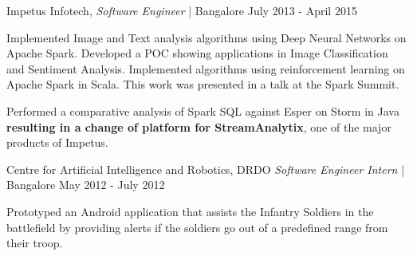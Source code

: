 \begin{cventries2}
  \cventrynew
    { Impetus Infotech, \textnormal{\textit{Software Engineer} | Bangalore}} %
    {July 2013 - April 2015} %
    {
      \begin{cvitems} %
        \item {Implemented Image and Text analysis algorithms using Deep Neural Networks on Apache Spark. Developed a POC showing applications in Image Classification and Sentiment Analysis. Implemented algorithms using reinforcement learning on Apache Spark in Scala. This work was presented in a talk at the Spark Summit.} 
        \item {Performed a comparative analysis of Spark SQL against Esper on Storm in Java \textbf{resulting in a change of platform for StreamAnalytix}, one of the major products of Impetus.}
      \end{cvitems}
    }




  \cventrynew
    { Centre for Artificial Intelligence and Robotics, DRDO \textnormal{\textit{Software Engineer Intern} | Bangalore}} %
    {May 2012 - July 2012} %
    {
      \begin{cvitems} %
        \item {Prototyped an Android application that assists the Infantry Soldiers in the battlefield by providing alerts if the soldiers go out of a predefined range from their troop.} 
      \end{cvitems}
    }

\end{cventries2}
